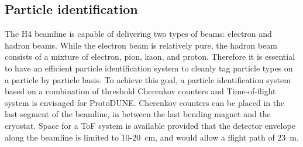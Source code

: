 \subsection{Particle identification}
The H4 beamline is capable of delivering two types of beams: electron and hadron beams. While the electron beam is relatively pure, the hadron beam consists of a mixture of electron, pion, kaon, and proton. Therefore it is essential to have an efficient particle identification system to cleanly tag particle types on a particle by particle basis. To achieve this goal, a particle identification system based on a combination of threshold Cherenkov counters and Time-of-flight system is envisaged for ProtoDUNE. 
Cherenkov counters can be placed in the last segment of the beamline, in between the last bending magnet and the cryostat. Space for a ToF system is available provided that the detector envelope along the beamline is limited to 10-20~cm,
and would allow a flight path of 23~m.

